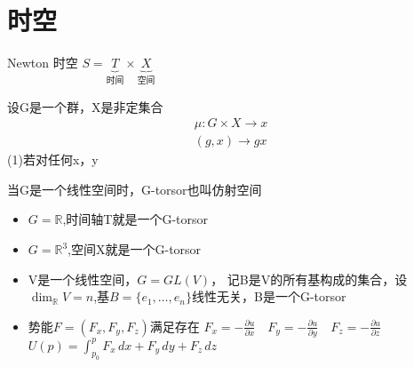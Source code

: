 \documentclass[12pt, a4paper, oneside, UTF8]{ctexbook}  %
\newcommand{\pa}{\partial}
\begin{document}
\section{时空}
\begin{defn}
Newton 时空 \(S=\underbrace{T}_{\text{时间}}\times
\underbrace{X}_{\text{空间}}\)

设G是一个群，X是非定集合
\begin{gather*}
    \mu: G\times X\rightarrow x\\
    (g,x)\rightarrow g x
\end{gather*}
(1)若对任何x，y


\end{defn}
\begin{corollary}
当G是一个线性空间时，G-torsor也叫仿射空间
\begin{itemize}
    \item $G=\mathbb{R}$,时间轴T就是一个G-torsor
    \item $G=\mathbb{R}^3$,空间X就是一个G-torsor
    \item V是一个线性空间，$G=GL(V)$，
    记B是V的所有基构成的集合，设$\dim_{\mathbb{R}}V=n$,基$B=\{e_1,\dots,e_n\}$线性无关，B是一个G-torsor
    \item 势能$F=(F_x,F_y,F_z)$满足存在
    \(F_x=-\frac{\pa u}{\pa x}\quad F_y=-\frac{\pa u}{\pa y}\quad F_z=-\frac{\pa u}{\pa z}\)
    \(U(p)=\int_{p_0}^{p}F_x\,dx+F_y\,dy+F_z\,dz\)
\end{itemize}
\end{corollary}
\end{document}
